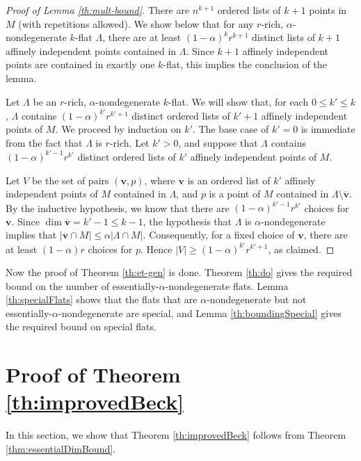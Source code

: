 \documentclass{article}
\begin{document}
\begin{proof}[Proof of Lemma \ref{th:mult-bound}]
There are $n^{k+1}$ ordered lists of $k+1$ points in $M$ (with repetitions allowed).
We show below that for any $r$-rich, $\alpha$-nondegenerate $k$-flat $\Lambda$, there are at least $(1-\alpha)^k r^{k+1}$ distinct lists of $k+1$ affinely independent points contained in $\Lambda$.
Since $k+1$ affinely independent points are contained in exactly one $k$-flat, this implies the conclusion of the lemma.

Let $\Lambda$ be an $r$-rich, $\alpha$-nondegenerate $k$-flat.
We will show that, for each $0 \leq k' \leq k$, $\Lambda$ contains $(1-\alpha)^{k'} r^{k'+1}$ distinct ordered lists of $k'+1$ affinely independent points of $M$.
We proceed by induction on $k'$.
The base case of $k'=0$ is immediate from the fact that $\Lambda$ is $r$-rich.
Let $k' > 0$, and suppose that $\Lambda$ contains $(1-\alpha)^{k' - 1} r^{k'}$ distinct ordered lists of $k'$ affinely independent points of $M$.

Let $V$ be the set of pairs $(\mathbf{v},p)$, where $\mathbf{v}$  is an ordered list of $k'$ affinely independent points of $M$ contained in $\Lambda$, and $p$ is a point of $M$ contained in $\Lambda \setminus \overline{\mathbf{v}}$.
By the inductive hypothesis, we know that there are $(1-\alpha)^{k'-1}r^{k'}$ choices for $\mathbf{v}$.
Since $\dim{\overline{\mathbf{v}}} = k'-1 \leq k-1$, the hypothesis that $\Lambda$ is $\alpha$-nondegenerate implies that $|\overline{\mathbf{v}} \cap M| \leq \alpha |\Lambda \cap M|$.
Consequently, for a fixed choice of $\mathbf{v}$, there are at least $(1 - \alpha) r$ choices for $p$.
Hence $|V| \geq (1-\alpha)^{k'}r^{k' + 1}$, as claimed.

\end{proof}

Now the proof of Theorem \ref{th:et-gen} is done.
Theorem \ref{th:do} gives the required bound on the number of essentially-$\alpha$-nondegenerate flats.
Lemma \ref{th:specialFlats} shows that the flats that are $\alpha$-nondegenerate but not essentially-$\alpha$-nondegenerate are special, and Lemma \ref{th:boundingSpecial} gives the required bound on special flats.


\section{Proof of Theorem \ref{th:improvedBeck}}

In this section, we show that Theorem \ref{th:improvedBeck} follows from Theorem \ref{thm:essentialDimBound}.
\end{document}
